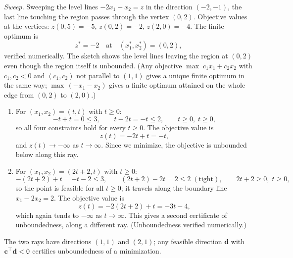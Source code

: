 \emph{Sweep.} Sweeping the level lines $-2x_1 - x_2 = z$ in the direction $(-2,-1)$, the last line touching the region passes through the vertex $(0,2)$. Objective values at the vertices: $z(0,5) = -5$, $z(0,2) = -2$, $z(2,0) = -4$. The finite optimum is
\[
z^* = -2 \quad \text{at} \quad (x_1^*, x_2^*) = (0, 2),
\]
verified numerically. The sketch shows the level lines leaving the region at $(0,2)$ even though the region itself is unbounded. (Any objective $\max\; c_1 x_1 + c_2 x_2$ with $c_1, c_2 < 0$ and $(c_1,c_2)$ not parallel to $(1,1)$ gives a unique finite optimum in the same way; $\max\, (-x_1 - x_2)$ gives a finite optimum attained on the whole edge from $(0,2)$ to $(2,0)$.)

\begin{enumerate}
\item For $(x_1, x_2) = (t, t)$ with $t \geq 0$:
\[
-t + t = 0 \leq 3, \qquad t - 2t = -t \leq 2, \qquad t \geq 0,\; t \geq 0,
\]
so all four constraints hold for every $t \geq 0$. The objective value is
\[
z(t) = -2t + t = -t,
\]
and $z(t) \to -\infty$ as $t \to \infty$. Since we minimize, the objective is unbounded below along this ray.
\item For $(x_1, x_2) = (2t + 2, t)$ with $t \geq 0$:
\[
-(2t+2) + t = -t - 2 \leq 3, \qquad (2t + 2) - 2t = 2 \leq 2 \;(\text{tight}), \qquad 2t + 2 \geq 0,\; t \geq 0,
\]
so the point is feasible for all $t \geq 0$; it travels along the boundary line $x_1 - 2x_2 = 2$. The objective value is
\[
z(t) = -2(2t + 2) + t = -3t - 4,
\]
which again tends to $-\infty$ as $t \to \infty$. This gives a second certificate of unboundedness, along a different ray. (Unboundedness verified numerically.)
\end{enumerate}
The two rays have directions $(1,1)$ and $(2,1)$; any feasible direction $\mathbf d$ with $\mathbf{c}^\top \mathbf d < 0$ certifies unboundedness of a minimization.

